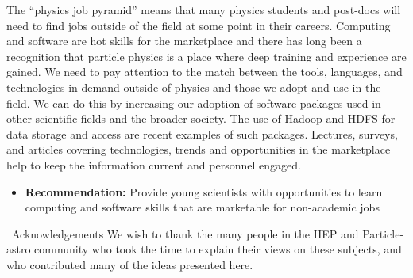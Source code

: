 The ``physics job pyramid'' means that many physics students and
post-docs will need to find jobs outside of the field at some point
in their careers. Computing and software are hot skills for the
marketplace and there has long been a recognition that particle
physics is a place where deep training and experience are gained.
We need to pay attention to the match between the tools, languages,
and technologies in demand outside of physics and those we adopt
and use in the field. We can do this by increasing our adoption of
software packages used in other scientific fields and the broader
society. The use of Hadoop and HDFS for data storage and access are
recent examples of such packages.   Lectures, surveys, and articles
covering technologies, trends and opportunities in the marketplace
help to keep the information current and personnel engaged.

\begin{itemize}
\item[] {\bf Recommendation:} Provide young scientists with opportunities to learn computing and software skills that are marketable for non-academic jobs
\end{itemize}

\ {Acknowledgements}
We wish to thank the many people in the HEP and Particle-astro
community who took the time to explain their views on these subjects,
and who contributed many of the ideas presented here.

